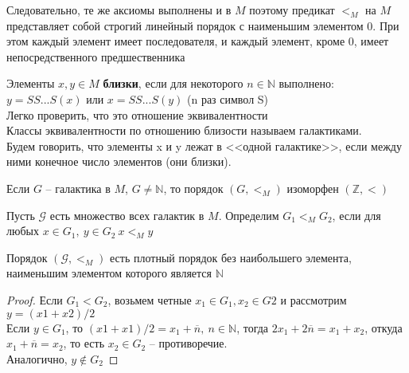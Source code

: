 Следовательно, те же аксиомы выполнены и в $M$ поэтому предикат $<_M$ на $M$ представляет
собой строгий линейный порядок с наименьшим элементом
0. При этом каждый элемент имеет последователя, и каждый элемент, кроме 0, имеет непосредственного предшественника
\begin{definition}
	Элементы $x,y \in M$ \textbf{близки}, если для некоторого $n \in \mathbb{N}$ выполнено:
	$y=SS...S(x)$ или $x=SS...S(y)$ (n раз символ S)\\
	Легко проверить, что это отношение эквивалентности\\
	Классы эквивалентности по отношению близости называем галактиками.\\
	Будем говорить, что элементы x и y лежат в <<одной галактике>>, если между ними конечное число элементов (они
	близки).
\end{definition}
\begin{proposition}
	Если $G$ -- галактика в $M$, $G \neq \mathbb{N}$, то порядок
	$(G,<_M)$ изоморфен $(\mathbb{Z},<)$ 
\end{proposition}
Пусть $\mathcal{G}$ есть множество всех галактик в $M$. Определим $G_{1}<_{M} G_{2}$, если
для любых $x \in G_{1}, \ y \in G_{2}\: x<_{M} y$
\begin{theorem}
	Порядок  $\left(\mathcal{G},<_{M}\right)$ есть плотный порядок без наибольшего элемента, наименьшим элементом
	которого является $\mathbb{N}$
\end{theorem}
\begin{proof}
	Если $G_1<G_2$, возьмем четные $x_1 \in G_1,x_2 \in G2$ и
	рассмотрим $y=(x1+x2)/2$\\
	Если $y \in G_1$, то $(x1+x1)/2=x_1+\overline{n}, \ n\in \mathbb{N}$, тогда
	$2x_1+2\overline{n}=x_1+x_2$, откуда $x_1+\overline{n}=x_2$, то есть $x_2\in G_2$ --
	противоречие.\\
	Аналогично, $y \notin G_2$
\end{proof}

